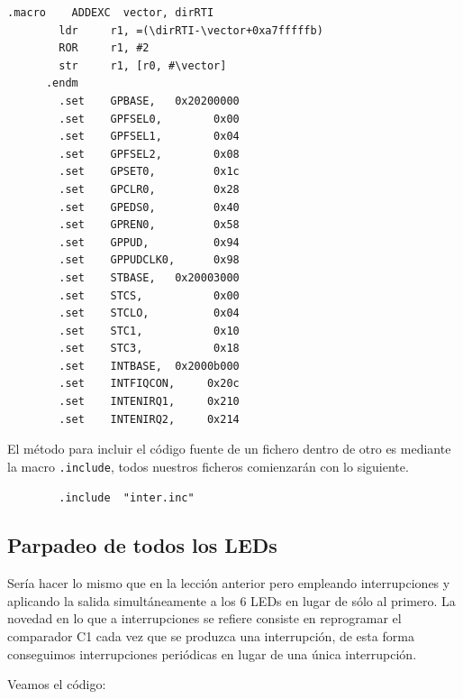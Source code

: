 \begin{lstlisting}[caption={inter.inc},label={lst:codigoPract5_0}]
      .macro    ADDEXC  vector, dirRTI
        ldr     r1, =(\dirRTI-\vector+0xa7fffffb)
        ROR     r1, #2
        str     r1, [r0, #\vector]
      .endm
        .set    GPBASE,   0x20200000
        .set    GPFSEL0,        0x00
        .set    GPFSEL1,        0x04
        .set    GPFSEL2,        0x08
        .set    GPSET0,         0x1c
        .set    GPCLR0,         0x28
        .set    GPEDS0,         0x40
        .set    GPREN0,         0x58
        .set    GPPUD,          0x94
        .set    GPPUDCLK0,      0x98
        .set    STBASE,   0x20003000
        .set    STCS,           0x00
        .set    STCLO,          0x04
        .set    STC1,           0x10
        .set    STC3,           0x18
        .set    INTBASE,  0x2000b000
        .set    INTFIQCON,     0x20c
        .set    INTENIRQ1,     0x210
        .set    INTENIRQ2,     0x214
\end{lstlisting}

El método para incluir el código fuente de un fichero dentro de otro es mediante
la macro {\tt .include}, todos nuestros ficheros comienzarán con lo siguiente.

\begin{lstlisting}
        .include  "inter.inc"
\end{lstlisting}

\subsection{Parpadeo de todos los LEDs}

Sería hacer lo mismo que en la lección anterior pero empleando interrupciones y aplicando
la salida simultáneamente a los 6 LEDs en lugar de sólo al primero. La novedad en lo
que a interrupciones se refiere consiste en reprogramar el comparador C1 cada vez que
se produzca una interrupción, de esta forma conseguimos interrupciones periódicas en lugar
de una única interrupción.

Veamos el código:

